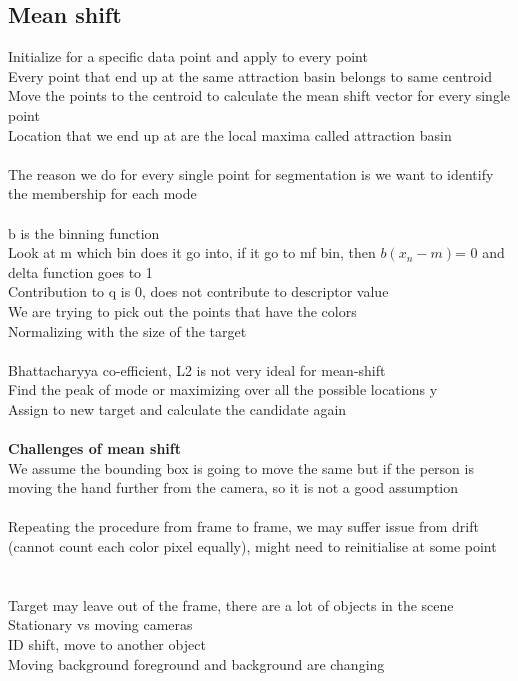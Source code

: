 \documentclass[11pt]{article}
\begin{document}
\subsection*{Mean shift}
Initialize for a specific data point and apply to every point\\
Every point that end up at the same attraction basin belongs to same centroid\\
Move the points to the centroid to calculate the mean shift vector for every single point\\
Location that we end up at are the local maxima called attraction basin\\\\
The reason we do for every single point for segmentation is we want to identify the membership for each mode
\\
\\
b is the binning function\\
Look at m which bin does it go into, if it go to mf bin, then $b(x_{n} - m) $= 0 and delta function goes to 1\\
Contribution to q is 0, does not contribute to descriptor value\\
We are trying to pick out the points that have the colors\\
Normalizing with the size of the target\\
\\
Bhattacharyya co-efficient, L2 is not very ideal for mean-shift\\
Find the peak of mode
or maximizing over all the possible locations y
\\
Assign to new target and calculate the candidate again\\\\
\textbf{Challenges of mean shift}\\
We assume the bounding box is going to move the same but if the person is moving the hand further from the camera, so it is not a good assumption
\\\\
Repeating the procedure from frame to frame, we may suffer issue from drift (cannot count each color pixel equally), might need to reinitialise at some point\\\\
\\
Target may leave out of the frame, there are a lot of objects in the scene\\
Stationary vs moving cameras\\
ID shift, move to another object\\
Moving background foreground and background are changing 
\\
\end{document}
